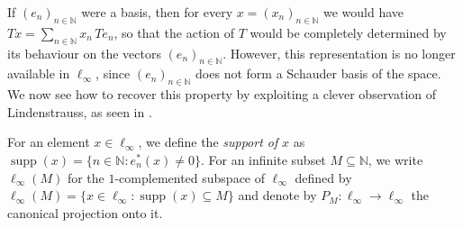 \documentclass[11pt]{amsart}
\theoremstyle{plain}
\theoremstyle{definition}
\numberwithin{equation}{section}
\newcommand{\N}{\mathbb{N}}
\newcommand{\supp}{\operatorname{supp}}
\begin{document}
If $(e_n)_{n \in \N}$ were a basis, then for every $x =(x_n)_{n \in \N}$ we would have $Tx = \sum_{n \in \N} x_n\, T e_n$, so that the action of $T$ would be completely determined by its behaviour on the vectors $(e_n)_{n \in \N}$. However, this representation is no longer available in $\ell_\infty$, since $(e_n)_{n \in \N}$ does not form a Schauder basis of the space. We now see how to recover this property by exploiting a clever observation of Lindenstrauss, as seen in \cite[Proof of the main theorem]{Lin1967}. 

For an element $x \in \ell_\infty$, we define the \emph{support of} $x$ as $\supp(x) = \{n \in \N: e_n^*(x) \not = 0\}$. For an infinite subset $M \subseteq \N$, we write $\ell_\infty(M)$ for the $1$-complemented subspace of $\ell_\infty$ defined by $\ell_\infty(M) = \{ x \in \ell_\infty : \supp(x) \subseteq M \}$ and denote by $P_M: \ell_\infty \to \ell_\infty$ the canonical projection onto it.
\end{document}
